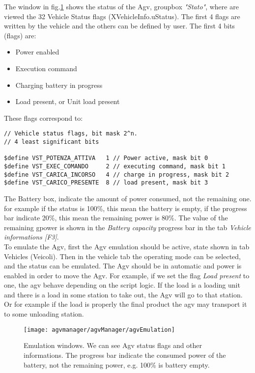 The window in fig.\ref{fig:refAgvEmu} shows the status of the Agv, groupbox \textit{"Stato"}, where are viewed the 32 Vehicle Status flags (XVehicleInfo.uStatus). The first 4 flags are written by the vehicle and the others can be defined by user.
The first 4 bits (flags) are:
\begin{itemize}
	\item Power enabled
	\item Execution command
	\item Charging battery in progress
	\item Load present, or Unit load present
\end{itemize}
These flags correspond to:
\begin{lstlisting}
// Vehicle status flags, bit mask 2^n.
// 4 least significant bits

$define VST_POTENZA_ATTIVA   1 // Power active, mask bit 0
$define VST_EXEC_COMANDO     2 // executing command, mask bit 1
$define VST_CARICA_INCORSO   4 // charge in progress, mask bit 2
$define VST_CARICO_PRESENTE  8 // load present, mask bit 3
\end{lstlisting}

The Battery box, indicate the amount of power consumed, not the remaining one. for example if the status is 100\%, this mean the battery is empty, if the progress bar indicate 20\%, this mean the remaining power is 80\%. The value of the remaining gpower is shown in the \textit{Battery capacity} progress bar in the tab \textit{Vehicle informations [F3]}.\\

To emulate the Agv, first the Agv emulation should be active, state shown in tab Vehicles (Veicoli). Then in the vehicle tab the operating mode can be selected, and the status can be emulated. The Agv should be in automatic and power is enabled in order to move the Agv.
For example, if we set the flag \textit{Load present} to one, the agv behave depending on the script logic. If the load is a loading unit and there is a load in some station to take out, the Agv will go to that station. Or for example if the load is properly the final product the agv may transport it to some unloading station.

\begin{figure}
	\centering\texttt{[image: agvmanager/agvManager/agvEmulation]}
	\caption{Emulation windows. We can see Agv status flags and other informations. The progress bar indicate the consumed power of the battery, not the remaining power, e.g. 100\% is battery empty. }
	\label{fig:refAgvEmu}
\end{figure}

